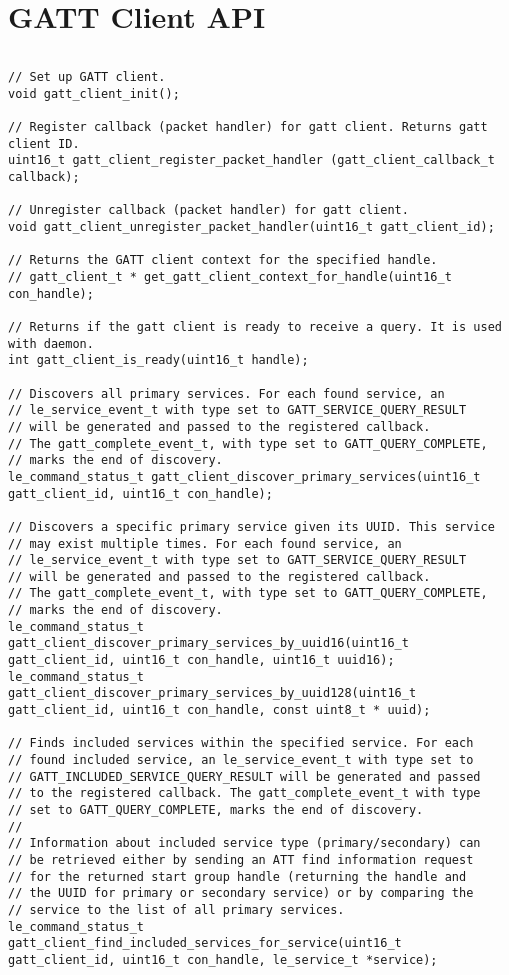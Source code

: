 \section{GATT Client API}
\label{appendix:api_gatt_client}
$ $
\begin{lstlisting}
// Set up GATT client.
void gatt_client_init();

// Register callback (packet handler) for gatt client. Returns gatt client ID.
uint16_t gatt_client_register_packet_handler (gatt_client_callback_t callback);

// Unregister callback (packet handler) for gatt client.
void gatt_client_unregister_packet_handler(uint16_t gatt_client_id);

// Returns the GATT client context for the specified handle.
// gatt_client_t * get_gatt_client_context_for_handle(uint16_t con_handle);

// Returns if the gatt client is ready to receive a query. It is used with daemon.
int gatt_client_is_ready(uint16_t handle);

// Discovers all primary services. For each found service, an
// le_service_event_t with type set to GATT_SERVICE_QUERY_RESULT
// will be generated and passed to the registered callback.
// The gatt_complete_event_t, with type set to GATT_QUERY_COMPLETE,
// marks the end of discovery.
le_command_status_t gatt_client_discover_primary_services(uint16_t gatt_client_id, uint16_t con_handle);

// Discovers a specific primary service given its UUID. This service
// may exist multiple times. For each found service, an
// le_service_event_t with type set to GATT_SERVICE_QUERY_RESULT
// will be generated and passed to the registered callback.
// The gatt_complete_event_t, with type set to GATT_QUERY_COMPLETE,
// marks the end of discovery.
le_command_status_t gatt_client_discover_primary_services_by_uuid16(uint16_t gatt_client_id, uint16_t con_handle, uint16_t uuid16);
le_command_status_t gatt_client_discover_primary_services_by_uuid128(uint16_t gatt_client_id, uint16_t con_handle, const uint8_t * uuid);

// Finds included services within the specified service. For each
// found included service, an le_service_event_t with type set to
// GATT_INCLUDED_SERVICE_QUERY_RESULT will be generated and passed
// to the registered callback. The gatt_complete_event_t with type
// set to GATT_QUERY_COMPLETE, marks the end of discovery.
//
// Information about included service type (primary/secondary) can
// be retrieved either by sending an ATT find information request
// for the returned start group handle (returning the handle and
// the UUID for primary or secondary service) or by comparing the
// service to the list of all primary services.
le_command_status_t gatt_client_find_included_services_for_service(uint16_t gatt_client_id, uint16_t con_handle, le_service_t *service);


\end{lstlisting}
